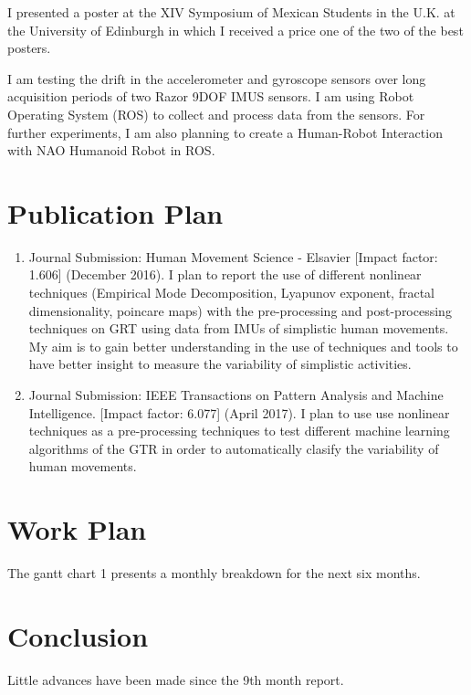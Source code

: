 \documentclass[10pt,journal,onecolumn,compsoc]{IEEEtran}
\begin{document}
I presented a poster at the XIV Symposium of Mexican Students in the U.K. at the University of Edinburgh
in which I received a price one of the two of the best posters.

I am testing the drift in 
the accelerometer and gyroscope sensors over long acquisition periods of two Razor 9DOF IMUS sensors. 
I am using Robot Operating System (ROS) to collect and process data from the sensors.
For further experiments, I am also planning  to create a Human-Robot Interaction with NAO Humanoid Robot in ROS.


\section{Publication Plan}

\begin{enumerate}
 \item Journal Submission: Human Movement Science - Elsavier [Impact factor: 1.606] (December 2016).
I plan to report the use of different nonlinear techniques 
(Empirical Mode Decomposition, Lyapunov exponent, fractal dimensionality, poincare maps)
with the pre-processing and post-processing techniques on GRT using data from IMUs of simplistic human movements.
My aim is to gain better understanding 
in the use of techniques and tools to have better insight to measure the variability 
of simplistic activities.

\item Journal Submission: IEEE Transactions on Pattern Analysis and Machine Intelligence.
[Impact factor: 6.077] (April 2017).
I plan to use use nonlinear techniques as a pre-processing techniques 
to test different machine learning algorithms of the GTR in order 
to automatically clasify the variability of human movements. 


\end{enumerate}




\section{Work Plan} 
The gantt chart 1 presents a monthly breakdown for the next six months.

\section{Conclusion}

Little advances have been made since the 9th month report.
\end{document}
